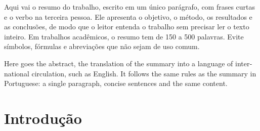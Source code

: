\documentclass[12pt,a4paper,oneside]{article}
\begin{document}
\begin{resumo}
Aqui vai o resumo do trabalho, escrito em um único parágrafo, com frases curtas e o verbo na terceira pessoa. Ele apresenta o objetivo, o método, os resultados e as conclusões, de modo que o leitor entenda o trabalho sem precisar ler o texto inteiro. Em trabalhos acadêmicos, o resumo tem de 150 a 500 palavras. Evite símbolos, fórmulas e abreviações que não sejam de uso comum.
\end{resumo}

\begin{otherlanguage}{english}
\begin{resumo}[Abstract]
Here goes the abstract, the translation of the summary into a language of international circulation, such as English. It follows the same rules as the summary in Portuguese: a single paragraph, concise sentences and the same content.
\end{resumo}
\end{otherlanguage}

\listadefiguras
\listadequadros
\listadetabelas

\begin{listadesiglas}
\end{listadesiglas}

\begin{listadesiglas}
\end{listadesiglas}

\sumario

\textual

\section{Introdução}
\end{document}
